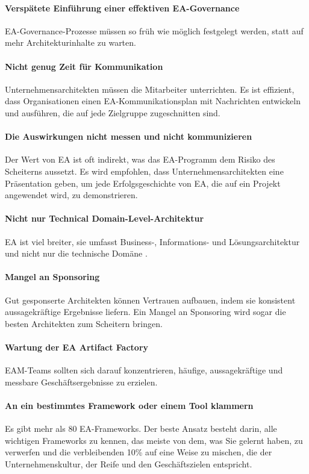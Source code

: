 \documentclass[
	doc,
	a4paper,
	helv
	]{apa6}
\begin{document}
\paragraph{Verspätete Einführung einer effektiven EA-Governance}
EA-Governance-Prozesse müssen so früh wie möglich festgelegt werden, statt auf mehr Architekturinhalte zu warten.
\paragraph{Nicht genug Zeit für Kommunikation}
Unternehmensarchitekten müssen die Mitarbeiter unterrichten. Es ist effizient, dass Organisationen einen EA-Kommunikationsplan mit Nachrichten entwickeln und ausführen, die auf jede Zielgruppe zugeschnitten sind.
\paragraph{Die Auswirkungen nicht messen und nicht kommunizieren}
Der Wert von EA ist oft indirekt, was das EA-Programm dem Risiko des Scheiterns aussetzt. Es wird empfohlen, dass Unternehmensarchitekten eine Präsentation geben, um jede Erfolgsgeschichte von EA, die auf ein Projekt angewendet wird, zu demonstrieren.
\paragraph{Nicht nur Technical Domain-Level-Architektur}
EA ist viel breiter, sie umfasst Business-, Informations- und Lösungsarchitektur und nicht nur die technische Domäne \mbox{\autocite{Ojo2016}.}
\paragraph{Mangel an Sponsoring}
Gut gesponserte Architekten können Vertrauen aufbauen, indem sie konsistent aussagekräftige Ergebnisse liefern. Ein Mangel an Sponsoring wird sogar die besten Architekten zum Scheitern bringen.
\paragraph{Wartung der EA Artifact Factory}
EAM-Teams sollten sich darauf konzentrieren, häufige, aussagekräftige und messbare Geschäftsergebnisse zu erzielen.
\paragraph{An ein bestimmtes Framework oder einem Tool klammern}
Es gibt mehr als 80 EA-Frameworks. Der beste Ansatz besteht darin, alle wichtigen Frameworks zu kennen, das meiste von dem, was Sie gelernt haben, zu verwerfen und die verbleibenden 10\% auf eine Weise zu mischen, die der Unternehmenskultur, der Reife und den Geschäftszielen entspricht.
\end{document}
